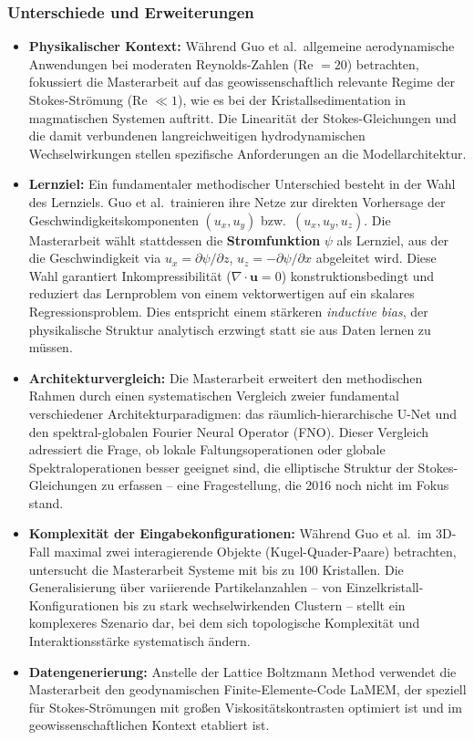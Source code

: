 \documentclass[a4paper,12pt]{article}
\begin{document}
\subsubsection*{Unterschiede und Erweiterungen}

\begin{itemize}
    \item \textbf{Physikalischer Kontext:} Während Guo et al.\ allgemeine aerodynamische Anwendungen bei moderaten Reynolds-Zahlen (Re $= 20$) betrachten, fokussiert die Masterarbeit auf das geowissenschaftlich relevante Regime der Stokes-Strömung (Re $\ll 1$), wie es bei der Kristallsedimentation in magmatischen Systemen auftritt. Die Linearität der Stokes-Gleichungen und die damit verbundenen langreichweitigen hydrodynamischen Wechselwirkungen stellen spezifische Anforderungen an die Modellarchitektur.
    
    \item \textbf{Lernziel:} Ein fundamentaler methodischer Unterschied besteht in der Wahl des Lernziels. Guo et al.\ trainieren ihre Netze zur direkten Vorhersage der Geschwindigkeitskomponenten $(u_x, u_y)$ bzw.\ $(u_x, u_y, u_z)$. Die Masterarbeit wählt stattdessen die \textbf{Stromfunktion} $\psi$ als Lernziel, aus der die Geschwindigkeit via $u_x = \partial\psi/\partial z$, $u_z = -\partial\psi/\partial x$ abgeleitet wird. Diese Wahl garantiert Inkompressibilität ($\nabla \cdot \mathbf{u} = 0$) konstruktionsbedingt und reduziert das Lernproblem von einem vektorwertigen auf ein skalares Regressionsproblem. Dies entspricht einem stärkeren \textit{inductive bias}, der physikalische Struktur analytisch erzwingt statt sie aus Daten lernen zu müssen.
    
    \item \textbf{Architekturvergleich:} Die Masterarbeit erweitert den methodischen Rahmen durch einen systematischen Vergleich zweier fundamental verschiedener Architekturparadigmen: das räumlich-hierarchische U-Net und den spektral-globalen Fourier Neural Operator (FNO). Dieser Vergleich adressiert die Frage, ob lokale Faltungsoperationen oder globale Spektraloperationen besser geeignet sind, die elliptische Struktur der Stokes-Gleichungen zu erfassen -- eine Fragestellung, die 2016 noch nicht im Fokus stand.
    
    \item \textbf{Komplexität der Eingabekonfigurationen:} Während Guo et al.\ im 3D-Fall maximal zwei interagierende Objekte (Kugel-Quader-Paare) betrachten, untersucht die Masterarbeit Systeme mit bis zu 100 Kristallen. Die Generalisierung über variierende Partikelanzahlen -- von Einzelkristall-Konfigurationen bis zu stark wechselwirkenden Clustern -- stellt ein komplexeres Szenario dar, bei dem sich topologische Komplexität und Interaktionsstärke systematisch ändern.
    
    \item \textbf{Datengenerierung:} Anstelle der Lattice Boltzmann Method verwendet die Masterarbeit den geodynamischen Finite-Elemente-Code LaMEM, der speziell für Stokes-Strömungen mit großen Viskositätskontrasten optimiert ist und im geowissenschaftlichen Kontext etabliert ist.
\end{itemize}
\end{document}
